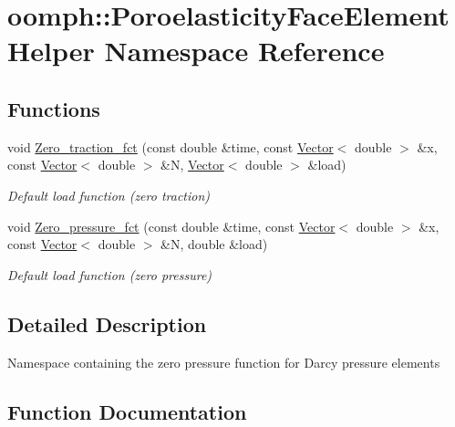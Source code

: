 \hypertarget{namespaceoomph_1_1PoroelasticityFaceElementHelper}{}\section{oomph\+:\+:Poroelasticity\+Face\+Element\+Helper Namespace Reference}
\label{namespaceoomph_1_1PoroelasticityFaceElementHelper}
\subsection*{Functions}
\begin{DoxyCompactItemize}
\item 
void \hyperlink{namespaceoomph_1_1PoroelasticityFaceElementHelper_a488acda61b46c3a3fe9e18339160c745}{Zero\+\_\+traction\+\_\+fct} (const double \&time, const \hyperlink{classoomph_1_1Vector}{Vector}$<$ double $>$ \&x, const \hyperlink{classoomph_1_1Vector}{Vector}$<$ double $>$ \&N, \hyperlink{classoomph_1_1Vector}{Vector}$<$ double $>$ \&load)
\begin{DoxyCompactList}\small\item\em Default load function (zero traction) \end{DoxyCompactList}\item 
void \hyperlink{namespaceoomph_1_1PoroelasticityFaceElementHelper_a48a53a85499ac3c4a176a44c1edc397d}{Zero\+\_\+pressure\+\_\+fct} (const double \&time, const \hyperlink{classoomph_1_1Vector}{Vector}$<$ double $>$ \&x, const \hyperlink{classoomph_1_1Vector}{Vector}$<$ double $>$ \&N, double \&load)
\begin{DoxyCompactList}\small\item\em Default load function (zero pressure) \end{DoxyCompactList}\end{DoxyCompactItemize}


\subsection{Detailed Description}
Namespace containing the zero pressure function for Darcy pressure elements 

\subsection{Function Documentation}
\mbox{\label{namespaceoomph_1_1PoroelasticityFaceElementHelper_a48a53a85499ac3c4a176a44c1edc397d}} 
